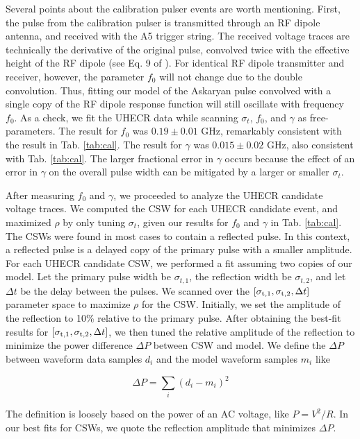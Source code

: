 \documentclass[amsmath,amssymb,aps,prd,10pt,twocolumn,showkeys]{revtex4}
\begin{document}
Several points about the calibration pulser events are worth mentioning.  First, the pulse from the calibration pulser is transmitted through an RF dipole antenna, and received with the A5 trigger string.  The received voltage traces are technically the derivative of the original pulse, convolved twice with the effective height of the RF dipole (see Eq. 9 of \cite{barwick2015timedomain-461}).  For identical RF dipole transmitter and receiver, however, the parameter $f_0$ will not change due to the double convolution.  Thus, fitting our model of the Askaryan pulse convolved with a single copy of the RF dipole response function will still oscillate with frequency $f_0$.  As a check, we fit the UHECR data while scanning $\sigma_t$, $f_0$, and $\gamma$ as free-parameters.  The result for $f_0$ was $0.19\pm 0.01$ GHz, remarkably consistent with the result in Tab. \ref{tab:cal}.  The result for $\gamma$ was $0.015\pm 0.02$ GHz, also consistent with Tab. \ref{tab:cal}.  The larger fractional error in $\gamma$ occurs because the effect of an error in $\gamma$ on the overall pulse width can be mitigated by a larger or smaller $\sigma_t$.

After measuring $f_0$ and $\gamma$, we proceeded to analyze the UHECR candidate voltage traces.  We computed the CSW for each UHECR candidate event, and maximized $\rho$ by only tuning $\sigma_t$, given our results for $f_0$ and $\gamma$ in Tab. \ref{tab:cal}.  The CSWs were found in most cases to contain a reflected pulse.  In this context, a reflected pulse is a delayed copy of the primary pulse with a smaller amplitude.  For each UHECR candidate CSW, we performed a fit assuming two copies of our model.  Let the primary pulse width be $\sigma_{t,1}$, the reflection width be $\sigma_{t,2}$, and let $\Delta t$ be the delay between the pulses.  We scanned over the $[\sigma_{\rm t,1},\sigma_{\rm t,2},\Delta t]$ parameter space to maximize $\rho$ for the CSW.  Initially, we set the amplitude of the reflection to 10\% relative to the primary pulse.  After obtaining the best-fit results for $[\sigma_{\rm t,1},\sigma_{\rm t,2},\Delta t]$, we then tuned the relative amplitude of the reflection to minimize the power difference $\Delta P$ between CSW and model.  We define the $\Delta P$ between waveform data samples $d_i$ and the model waveform samples $m_i$ like

\begin{equation}
\Delta P = \sum_i (d_i - m_i)^2
\end{equation}

\noindent
The definition is loosely based on the power of an AC voltage, like $P = V^2/R$.  In our best fits for CSWs, we quote the reflection amplitude that minimizes $\Delta P$.
\end{document}
